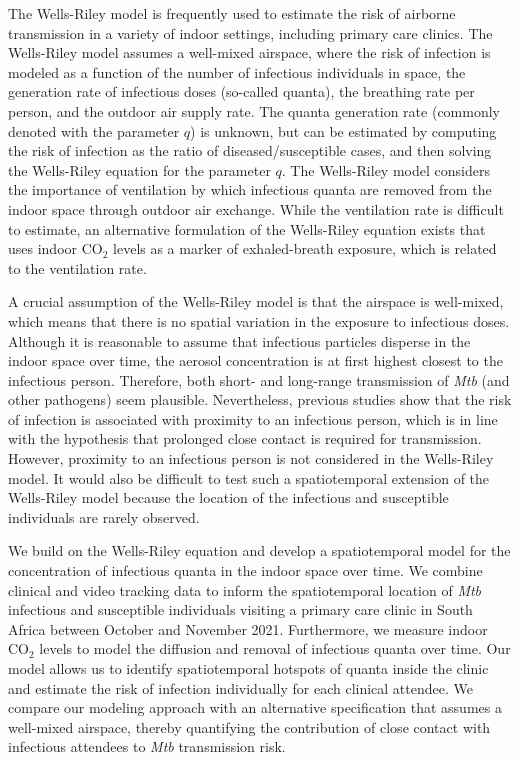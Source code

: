 \documentclass[fleqn,11pt]{wlscirep}
\begin{document}
The Wells-Riley model\cite{Riley1978AJE} is frequently used to estimate the risk of airborne transmission in a variety of indoor settings\cite{Andrews2014JID,Taylor2016IJTLD,Hella2017JInfect}, including primary care clinics\cite{Zurcher2022JID,McCreesh2021BMJGlobalHealth}. The Wells-Riley model assumes a well-mixed airspace, where the risk of infection is modeled as a function of the number of infectious individuals in space, the generation rate of infectious doses (so-called quanta), the breathing rate per person, and the outdoor air supply rate. The quanta generation rate (commonly denoted with the parameter $q$) is unknown, but can be estimated by computing the risk of infection as the ratio of diseased/susceptible cases, and then solving the Wells-Riley equation for the parameter $q$\cite{Nardell1991ARRD,Escombe2008PLoSMed}. The Wells-Riley model considers the importance of ventilation by which infectious quanta are removed from the indoor space through outdoor air exchange. While the ventilation rate is difficult to estimate, an alternative formulation of the Wells-Riley equation exists that uses indoor CO$_2$ levels as a marker of exhaled-breath exposure\cite{Rudnick2003IndoorAir}, which is related to the ventilation rate. 

A crucial assumption of the Wells-Riley model is that the airspace is well-mixed, which means that there is no spatial variation in the exposure to infectious doses. Although it is reasonable to assume that infectious particles disperse in the indoor space over time, the aerosol concentration is at first highest closest to the infectious person\cite{Vuorinen2020SafSci,Chen2020BuildEnv}. Therefore, both short- and long-range transmission of \emph{Mtb} (and other pathogens) seem plausible. Nevertheless, previous studies show that the risk of infection is associated with proximity to an infectious person\cite{Ko2004RiskAnal,Kenyon1996NEJM}, which is in line with the hypothesis that prolonged close contact is required for transmission\cite{Leung2020NatMed,Brankston2007LancetID,Narasimhan2013PulmonaryMed}. However, proximity to an infectious person is not considered in the Wells-Riley model. It would also be difficult to test such a spatiotemporal extension of the Wells-Riley model because the location of the infectious and susceptible individuals are rarely observed.    

We build on the Wells-Riley equation and develop a spatiotemporal model for the concentration of infectious quanta in the indoor space over time. We combine clinical and video tracking data to inform the spatiotemporal location of \emph{Mtb} infectious and susceptible individuals visiting a primary care clinic in South Africa between October and November 2021. Furthermore, we measure indoor CO$_2$ levels to model the diffusion and removal of infectious quanta over time. Our model allows us to identify spatiotemporal hotspots of quanta inside the clinic and estimate the risk of infection individually for each clinical attendee. We compare our modeling approach with an alternative specification that assumes a well-mixed airspace, thereby quantifying the contribution of close contact with infectious attendees to \emph{Mtb} transmission risk. 
\end{document}
